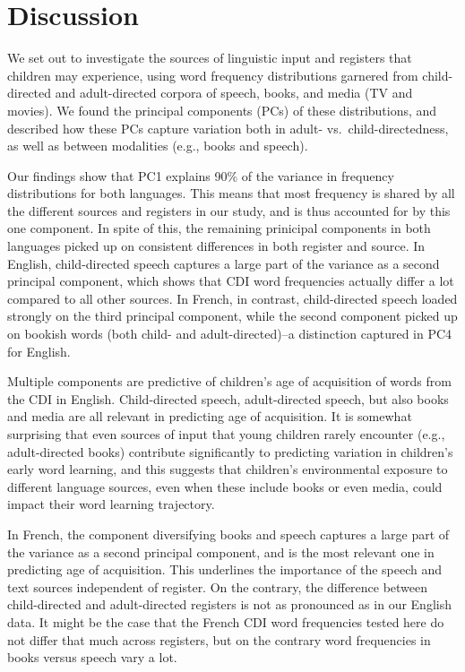 \documentclass[10pt, letterpaper]{article}
\begin{document}
\hypertarget{discussion}{%
\section{Discussion}\label{discussion}}

We set out to investigate the sources of linguistic input and registers
that children may experience, using word frequency distributions
garnered from child-directed and adult-directed corpora of speech,
books, and media (TV and movies). We found the principal components
(PCs) of these distributions, and described how these PCs capture
variation both in adult- vs.~child-directedness, as well as between
modalities (e.g., books and speech).

Our findings show that PC1 explains 90\% of the variance in frequency
distributions for both languages. This means that most frequency is
shared by all the different sources and registers in our study, and is
thus accounted for by this one component. In spite of this, the
remaining prinicipal components in both languages picked up on
consistent differences in both register and source. In English,
child-directed speech captures a large part of the variance as a second
principal component, which shows that CDI word frequencies actually
differ a lot compared to all other sources. In French, in contrast,
child-directed speech loaded strongly on the third principal component,
while the second component picked up on bookish words (both child- and
adult-directed)--a distinction captured in PC4 for English.

Multiple components are predictive of children's age of acquisition of
words from the CDI in English. Child-directed speech, adult-directed
speech, but also books and media are all relevant in predicting age of
acquisition. It is somewhat surprising that even sources of input that
young children rarely encounter (e.g., adult-directed books) contribute
significantly to predicting variation in children's early word learning,
and this suggests that children's environmental exposure to different
language sources, even when these include books or even media, could
impact their word learning trajectory.

In French, the component diversifying books and speech captures a large
part of the variance as a second principal component, and is the most
relevant one in predicting age of acquisition. This underlines the
importance of the speech and text sources independent of register. On
the contrary, the difference between child-directed and adult-directed
registers is not as pronounced as in our English data. It might be the
case that the French CDI word frequencies tested here do not differ that
much across registers, but on the contrary word frequencies in books
versus speech vary a lot.
\end{document}
